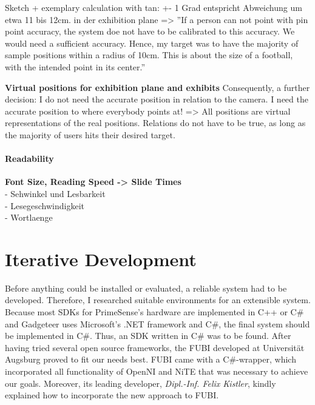 Sketch + exemplary calculation with tan: +- 1 Grad entspricht Abweichung um etwa 11 bis 12cm. in der exhibition plane => ''If a person can not point with pin point accuracy, the system doe not have to be calibrated to this accuracy. We would need a sufficient accuracy. Hence, my target was to have the majority of sample positions within a radius of 10cm. This is about the size of a football, with the intended point in its center.''

\textbf{Virtual positions for exhibition plane and exhibits} Consequently, a further decision: I do not need the accurate position in relation to the camera. I need the accurate position to where everybody points at! => All positions are virtual representations of the real positions. Relations do not have to be true, as long as the majority of users hits their desired target.


\paragraph{Readability} \textbf{Font Size, Reading Speed -> Slide Times}
\\
- Sehwinkel und Lesbarkeit~\cite{SehwinkelLesbarkeit}
\\
- Lesegeschwindigkeit~\cite{Lesegeschwindigkeit}
\\
- Wortlaenge~\cite{Wortlaenge}


\section{Iterative Development}
\label{installation_testing}

Before anything could be installed or evaluated, a reliable system had to be developed. Therefore, I researched suitable environments for an extensible system. Because most \ac{SDK}s for PrimeSense's hardware are implemented in C++ or C$\#$ and Gadgeteer uses Microsoft's .NET framework and C$\#$, the final system should be implemented in C$\#$. Thus, an \ac{SDK} written in C$\#$ was to be found. After having tried several open source frameworks, the \ac{FUBI} developed at Universität Augsburg proved to fit our needs best. \ac{FUBI} came with a C$\#$-wrapper, which incorporated all functionality of OpenNI and NiTE that was necessary to achieve our goals. Moreover, its leading developer, \textit{Dipl.-Inf. Felix Kistler}, kindly explained how to incorporate the new approach to \ac{FUBI}.  


